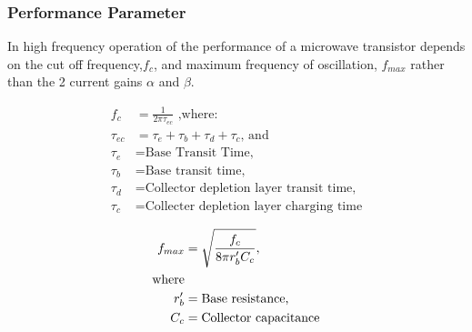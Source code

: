 \begin{frame}
  \frametitle{Performance Parameter}
  In high frequency operation of the performance of a microwave transistor depends on the cut off frequency,$f_c$, and maximum frequency of oscillation, $f_{max}$ rather than the 2 current gains $\alpha$ and $\beta$.

  \begin{align*}
    f_c &= \frac{1}{2\pi\tau_{ec}}\text{ ,where: } \\
    \tau_{ec} &= \tau_e + \tau_b + \tau_d + \tau_c\text{, and}\\
    \tau_e &= \text{Base Transit Time,}\\
    \tau_b &= \text{Base transit time,}\\
    \tau_d &= \text{Collector depletion layer transit time,}\\
    \tau_c &= \text{Collecter depletion layer charging time}
  \end{align*}
\end{frame}

\begin{frame}
  \begin{align*}
    f_{max} &= \sqrt{\frac{f_c}{8\pi r\sp{\prime}_{b}C_c}}, \\
    \text{where}\\
    r\sp{\prime}_{b} &= \text{Base resistance,}\\
    C_c &= \text{Collector capacitance}
  \end{align*}
\end{frame}